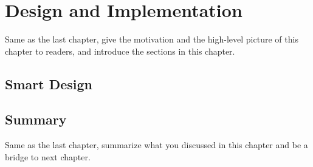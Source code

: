 \chapter{Design and Implementation}
\label{cha:design}

Same as the last chapter, give the motivation and the high-level
picture of this chapter to readers, and introduce the sections in this
chapter.

\section{Smart Design}
\label{sec:des-hotpath}

\section{Summary}
Same as the last chapter, summarize what you discussed in this chapter and
be a bridge to next chapter.
